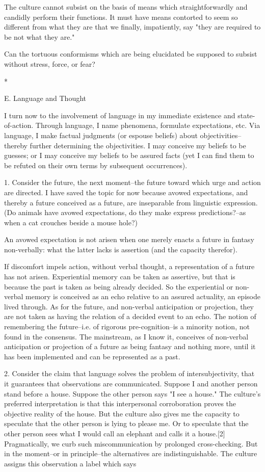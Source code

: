 The culture cannot subsist on the basis of means which straightforwardly and candidly perform their functions. It must have means contorted to seem so different from what they are that we finally, impatiently, say "they are required to be not what they are."

Can the tortuous conformisms which are being elucidated be supposed to subsist without stress, force, or fear?

*

E. Language and Thought

I turn now to the involvement of language in my immediate existence and state-of-action. Through language, I name phenomena, formulate expectations, etc. Via language, I make factual judgments (or espouse beliefs) about objectivities--thereby further determining the objectivities. I may conceive my beliefs to be guesses; or I may conceive my beliefs to be assured facts (yet I can find them to be refuted on their own terms by subsequent occurrences).

1. Consider the future, the next moment--the future toward which urge and action are directed. I have saved the topic for now because avowed expectations, and thereby a future conceived as a future, are inseparable from linguistic expression. (Do animals have avowed expectations, do they make express predictions?--as when a cat crouches beside a mouse hole?)

An avowed expectation is not arisen when one merely enacts a future in fantasy non-verbally: what the latter lacks is assertion (and the capacity therefor).

If discomfort impels action, without verbal thought, a representation of a future has not arisen. Experiential memory can be taken as assertive, but that is because the past is taken as being already decided. So the experiential or non-verbal memory is conceived as an echo relative to an assured actuality, an episode lived through. As for the future, and non-verbal anticipation or projection, they are not taken as having the relation of a decided event to an echo. The notion of remembering the future--i.e. of rigorous pre-cognition--is a minority notion, not found in the consensus. The mainstream, as I know it, conceives of non-verbal anticipation or projection of a future as being fantasy and nothing more, until it has been implemented and can be represented as a past.

2. Consider the claim that language solves the problem of intersubjectivity, that it guarantees that observations are communicated. Suppose I and another person stand before a house. Suppose the other person says "I see a house." The culture's preferred interpretation is that this interpersonal corroboration proves the objective reality of the house. But the culture also gives me the capacity to speculate that the other person is lying to please me. Or to speculate that the other person sees what I would call an elephant and calls it a house.[2] Pragmatically, we curb such miscommunication by prolonged cross-checking. But in the moment--or in principle--the alternatives are indistinguishable. The culture assigns this observation a label which says

